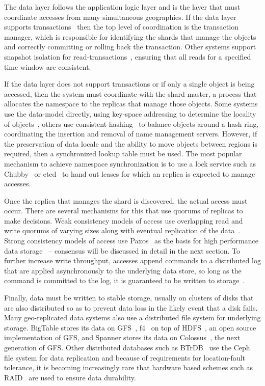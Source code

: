 The data layer follows the application logic layer and is the layer that must coordinate accesses from many simultaneous geographies.
If the data layer supports transactions~\cite{hat,calvindb,calvinfs,cockroachdb,vitess,aurora} then the top level of coordination is the transaction manager, which is responsible for identifying the shards that manage the objects and correctly committing or rolling back the transaction.
Other systems support snapshot isolation for read-transactions~\cite{spanner,megastore}, ensuring that all reads for a specified time window are consistent.

If the data layer does not support transactions or if only a single object is being accessed, then the system must coordinate with the shard master, a process that allocates the namespace to the replicas that manage those objects.
Some systems use the data-model directly, using key-space addressing to determine the locality of objects~\cite{bigtable,spanner}, others use consistent hashing~\cite{chord,scatter} to balance objects around a hash ring, coordinating the insertion and removal of name management servers.
However, if the preservation of data locale and the ability to move objects between regions is required, then a synchronized lookup table must be used.
The most popular mechanism to achieve namespace synchronization is to use a lock service such as Chubby~\cite{chubby} or etcd~\cite{etcd_raft} to hand out leases for which an replica is expected to manage accesses.

Once the replica that manages the shard is discovered, the actual access must occur.
There are several mechanisms for this that use quorums of replicas to make decisions.
Weak consistency models of access use overlapping read and write quorums of varying sizes along with eventual replication of the data~\cite{dynamo}.
Strong consistency models of access use Paxos~\cite{paxos} as the basis for high performance data storage~\cite{bolosky_paxos_2011,lampson_how_1996} -- consensus will be discussed in detail in the next section.
To further increase write throughput, accesses append commands to a distributed log that are applied asynchronously to the underlying data store, so long as the command is committed to the log, it is guaranteed to be written to storage~\cite{logbase,logfs,log_memory}.

Finally, data must be written to stable storage, usually on clusters of disks that are also distributed so as to prevent data loss in the likely event that a disk fails.
Many geo-replicated data systems also use a distributed file system for underlying storage.
BigTable stores its data on GFS~\cite{gfs}, f4~\cite{f4} on top of HDFS~\cite{hdfs}, an open source implementation of GFS, and Spanner stores its data on Colossus~\cite{colossus}, the next generation of GFS.
Other distributed databases such as BTrDB~\cite{btrdb} use the Ceph~\cite{ceph} file system for data replication and because of requirements for location-fault tolerance, it is becoming increasingly rare that hardware based schemes such as RAID~\cite{raid} are used to ensure data durability.

